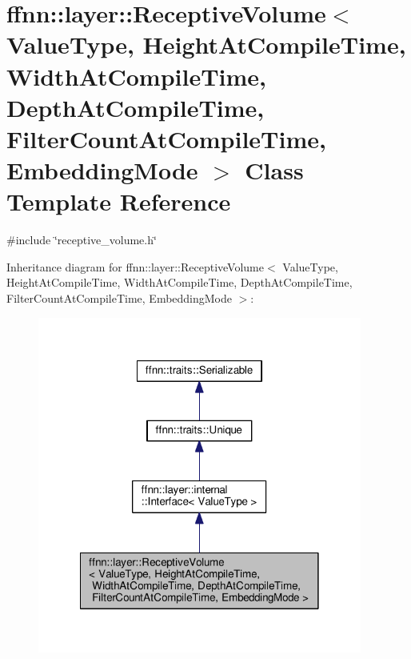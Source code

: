 \hypertarget{classffnn_1_1layer_1_1_receptive_volume}{\section{ffnn\-:\-:layer\-:\-:Receptive\-Volume$<$ Value\-Type, Height\-At\-Compile\-Time, Width\-At\-Compile\-Time, Depth\-At\-Compile\-Time, Filter\-Count\-At\-Compile\-Time, Embedding\-Mode $>$ Class Template Reference}
\label{classffnn_1_1layer_1_1_receptive_volume}
}


{\ttfamily \#include \char`\"{}receptive\-\_\-volume.\-h\char`\"{}}



Inheritance diagram for ffnn\-:\-:layer\-:\-:Receptive\-Volume$<$ Value\-Type, Height\-At\-Compile\-Time, Width\-At\-Compile\-Time, Depth\-At\-Compile\-Time, Filter\-Count\-At\-Compile\-Time, Embedding\-Mode $>$\-:
\nopagebreak
\begin{figure}[H]
\begin{center}
\leavevmode
\includegraphics[width=302pt]{classffnn_1_1layer_1_1_receptive_volume__inherit__graph}
\end{center}
\end{figure}


